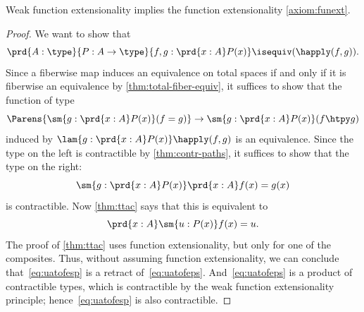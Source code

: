 %
\begin{thm}\label{wfetofe}
Weak function extensionality implies the function extensionality \cref{axiom:funext}.
\end{thm}

\begin{proof}
We want to show that
\begin{equation*}
\prd{A:\type}{P:A\to\type}{f,g:\prd{x:A}P(x)}\isequiv(\happly (f,g)).
\end{equation*}
Since a fiberwise map induces an equivalence on total spaces if and only if it is fiberwise an equivalence by \cref{thm:total-fiber-equiv}, it suffices to show that the function of type
\begin{equation*}
\Parens{\sm{g:\prd{x:A}P(x)}(f= g)} \to \sm{g:\prd{x:A}P(x)}(f\htpy g)
\end{equation*}
induced by $\lam{g:\prd{x:A}P(x)} \happly (f,g)$ is an equivalence.
Since the type on the left is contractible by \cref{thm:contr-paths}, it suffices to show that the type on the right:
\begin{equation}\label{eq:uatofesp}
\sm{g:\prd{x:A}P(x)}\prd{x:A}f(x)= g(x)
\end{equation}
is contractible.
Now \cref{thm:ttac} says that this is equivalent to
\begin{equation}\label{eq:uatofeps}
\prd{x:A}\sm{u:P(x)}f(x)= u.
\end{equation}
The proof of \cref{thm:ttac} uses function extensionality, but only for one of the composites.
Thus, without assuming function extensionality, we can conclude that~\eqref{eq:uatofesp} is a retract of~\eqref{eq:uatofeps}.
And~\eqref{eq:uatofeps} is a product of contractible types, which is contractible by the weak function extensionality principle; hence~\eqref{eq:uatofesp} is also contractible.
\end{proof}

